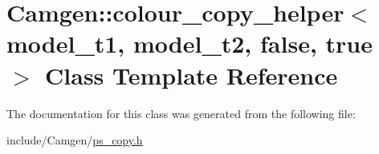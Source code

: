 \hypertarget{a00076}{\section{Camgen\-:\-:colour\-\_\-copy\-\_\-helper$<$ model\-\_\-t1, model\-\_\-t2, false, true $>$ Class Template Reference}
\label{a00076}
}


The documentation for this class was generated from the following file\-:\begin{DoxyCompactItemize}
\item 
include/\-Camgen/\hyperlink{a00712}{ps\-\_\-copy.\-h}\end{DoxyCompactItemize}
